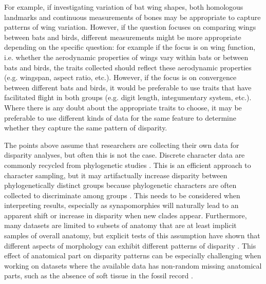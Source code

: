 \documentclass[12pt,letterpaper]{article}
\begin{document}
For example, if investigating variation of bat wing shapes, both homologous landmarks and continuous measurements of bones may be appropriate to capture patterns of wing variation.
However, if the question focuses on comparing wings between bats and birds, different measurements might be more appropriate depending on the specific question: for example if the focus is on wing function, i.e. whether the aerodynamic properties of wings vary within bats or between bats and birds, the traits collected should reflect these aerodynamic properties (e.g. wingspan, aspect ratio, etc.).
However, if the focus is on convergence between different bats and birds, it would be preferable to use traits that have facilitated flight in both groups (e.g. digit length, integumentary system, etc.).
Where there is any doubt about the appropriate traits to choose, it may be preferable to use different kinds of data for the same feature to determine whether they capture the same pattern of disparity.

The points above assume that researchers are collecting their own data for disparity analyses, but often this is not the case.
Discrete character data are commonly recycled from phylogenetic studies \citep[][e.g]{Foote1989-fd, Deline2018-le}.
This is an efficient approach to character sampling, but it may artifactually increase disparity between phylogenetically distinct groups because phylogenetic characters are often collected to discriminate among groups \citep{Foote1995-do}.
This needs to be considered when interpreting results, especially as synapomorphies will naturally lead to an apparent shift or increase in disparity when new clades appear.
Furthermore, many datasets are limited to subsets of anatomy that are at least implicit samples of overall anatomy, but explicit tests of this assumption have shown that different aspects of morphology can exhibit different patterns of disparity \citep{Hopkins2017-cf}.
This effect of anatomical part on disparity patterns can be especially challenging when working on datasets where the available data has non-random missing anatomical parts, such as the absence of soft tissue in the fossil record \citep{Deline2018-le}.
\end{document}
